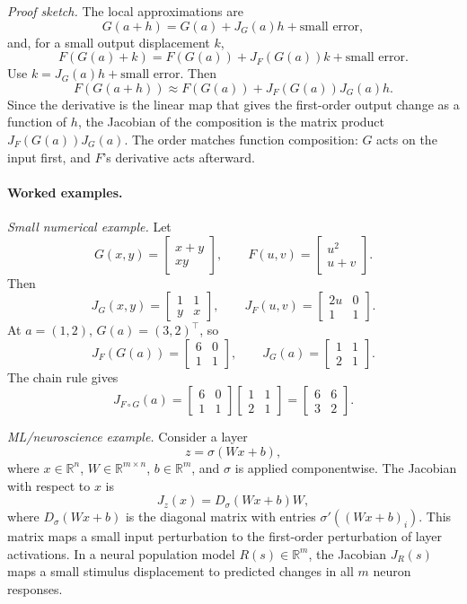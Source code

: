 \emph{Proof sketch.} The local approximations are
\[
G(a+h)=G(a)+J_G(a)h+\text{small error},
\]
and, for a small output displacement \(k\),
\[
F(G(a)+k)=F(G(a))+J_F(G(a))k+\text{small error}.
\]
Use \(k=J_G(a)h+\text{small error}\). Then
\[
F(G(a+h))
\approx F(G(a))+J_F(G(a))J_G(a)h.
\]
Since the derivative is the linear map that gives the first-order output change as a function of \(h\), the Jacobian of the composition is the matrix product \(J_F(G(a))J_G(a)\). The order matches function composition: \(G\) acts on the input first, and \(F\)'s derivative acts afterward.

\paragraph{Worked examples.}
\emph{Small numerical example.} Let
\[
G(x,y)=
\begin{bmatrix}
x+y\\
xy
\end{bmatrix},
\qquad
F(u,v)=
\begin{bmatrix}
u^2\\
u+v
\end{bmatrix}.
\]
Then
\[
J_G(x,y)=
\begin{bmatrix}
1&1\\
y&x
\end{bmatrix},
\qquad
J_F(u,v)=
\begin{bmatrix}
2u&0\\
1&1
\end{bmatrix}.
\]
At \(a=(1,2)\), \(G(a)=(3,2)^\top\), so
\[
J_F(G(a))=
\begin{bmatrix}
6&0\\
1&1
\end{bmatrix},
\qquad
J_G(a)=
\begin{bmatrix}
1&1\\
2&1
\end{bmatrix}.
\]
The chain rule gives
\[
J_{F\circ G}(a)
=
\begin{bmatrix}
6&0\\
1&1
\end{bmatrix}
\begin{bmatrix}
1&1\\
2&1
\end{bmatrix}
=
\begin{bmatrix}
6&6\\
3&2
\end{bmatrix}.
\]

\emph{ML/neuroscience example.} Consider a layer
\[
z=\sigma(Wx+b),
\]
where \(x\in\mathbb{R}^n\), \(W\in\mathbb{R}^{m\times n}\), \(b\in\mathbb{R}^m\), and \(\sigma\) is applied componentwise. The Jacobian with respect to \(x\) is
\[
J_z(x)=D_\sigma(Wx+b)W,
\]
where \(D_\sigma(Wx+b)\) is the diagonal matrix with entries \(\sigma'((Wx+b)_i)\). This matrix maps a small input perturbation to the first-order perturbation of layer activations. In a neural population model \(R(s)\in\mathbb{R}^m\), the Jacobian \(J_R(s)\) maps a small stimulus displacement to predicted changes in all \(m\) neuron responses.

